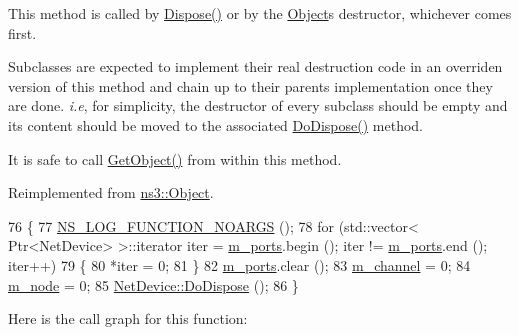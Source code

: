 This method is called by \hyperlink{classns3_1_1Object_aa90ae598863f6c251cdab3c3722afdaf}{Dispose()} or by the \hyperlink{classns3_1_1Object}{Object}\textquotesingle{}s destructor, whichever comes first.

Subclasses are expected to implement their real destruction code in an overriden version of this method and chain up to their parent\textquotesingle{}s implementation once they are done. {\itshape i.\+e}, for simplicity, the destructor of every subclass should be empty and its content should be moved to the associated \hyperlink{classns3_1_1BridgeNetDevice_ac8233fc38afed1acc24fc9d3cb19d498}{Do\+Dispose()} method.

It is safe to call \hyperlink{classns3_1_1Object_a13e18c00017096c8381eb651d5bd0783}{Get\+Object()} from within this method. 

Reimplemented from \hyperlink{classns3_1_1Object_a475d429a75d302d4775f4ae32479b287}{ns3\+::\+Object}.


\begin{DoxyCode}
76 \{
77   \hyperlink{log-macros-disabled_8h_a8f7e4afc291c9d29a65c18ac1f79197b}{NS\_LOG\_FUNCTION\_NOARGS} ();
78   \textcolor{keywordflow}{for} (std::vector< Ptr<NetDevice> >::iterator iter = \hyperlink{classns3_1_1BridgeNetDevice_accf2a9a81b4be28b155d6b5aeeb185be}{m\_ports}.begin (); iter != 
      \hyperlink{classns3_1_1BridgeNetDevice_accf2a9a81b4be28b155d6b5aeeb185be}{m\_ports}.end (); iter++)
79     \{
80       *iter = 0;
81     \}
82   \hyperlink{classns3_1_1BridgeNetDevice_accf2a9a81b4be28b155d6b5aeeb185be}{m\_ports}.clear ();
83   \hyperlink{classns3_1_1BridgeNetDevice_a091384e0ef3d890c26a26d9681b22986}{m\_channel} = 0;
84   \hyperlink{classns3_1_1BridgeNetDevice_a1880454d764d3c555c2fa71a9d66345e}{m\_node} = 0;
85   \hyperlink{classns3_1_1Object_a475d429a75d302d4775f4ae32479b287}{NetDevice::DoDispose} ();
86 \}
\end{DoxyCode}


Here is the call graph for this function\+:



